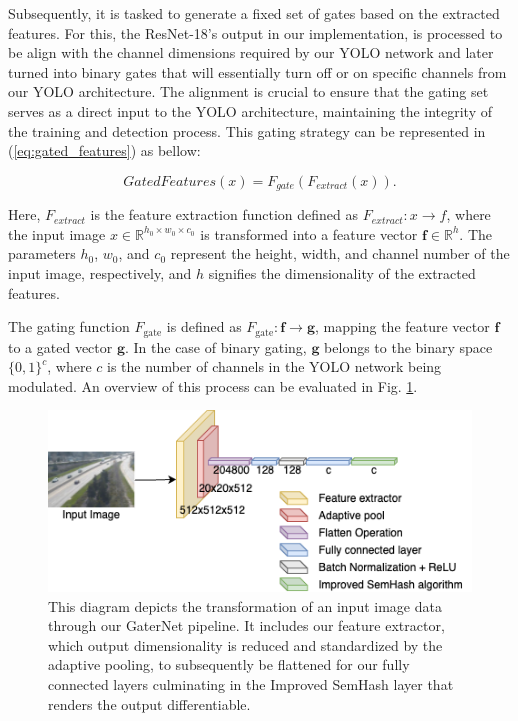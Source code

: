\documentclass[runningheads]{llncs}
\begin{document}
Subsequently, it is tasked to generate a fixed set of gates based on the extracted features. For this, the ResNet-18's output in our implementation, is processed to be align with the channel dimensions required by our YOLO network and later turned into binary gates that will essentially turn off or on specific channels from our YOLO architecture. The alignment is crucial to ensure that the gating set serves as a direct input to the YOLO architecture, maintaining the integrity of the training and detection process. This gating strategy can be represented in  (\ref{eq:gated_features}) as bellow:

\begin{equation}
    GatedFeatures(x) = F_{gate}(F_{extract}(x)).
    \label{eq:gated_features}
\end{equation}

Here, $F_{extract}$ is the feature extraction function defined as $F_{extract}: x \rightarrow f$, where the input image $x \in \mathbb{R}^{h_0 \times w_0 \times c_0} $ is transformed into a feature vector \( \mathbf{f} \in \mathbb{R}^h \). The parameters \( h_0 \), \( w_0 \), and \( c_0 \) represent the height, width, and channel number of the input image, respectively, and \( h \) signifies the dimensionality of the extracted features.

The gating function \( F_{\text{gate}} \) is defined as \( F_{\text{gate}}: \mathbf{f} \rightarrow \mathbf{g} \), mapping the feature vector \( \mathbf{f} \) to a gated vector \( \mathbf{g} \). In the case of binary gating, \( \mathbf{g} \) belongs to the binary space \( \{0,1\}^c \), where \( c \) is the number of channels in the YOLO network being modulated. An overview of this process can be evaluated in Fig. \ref{fig:feature_extractor}.

\begin{figure}[htbp]
    \centering
    \includegraphics[width=0.8\linewidth]{./Images/feature_extractor.png}
    \caption{This diagram depicts the transformation of an input image data through our GaterNet pipeline. It includes our feature extractor, which output dimensionality is reduced and standardized by the adaptive pooling, to subsequently be flattened for our fully connected layers culminating in the Improved SemHash layer that renders the output differentiable.}
    \label{fig:feature_extractor}
    \end{figure}
\end{document}
